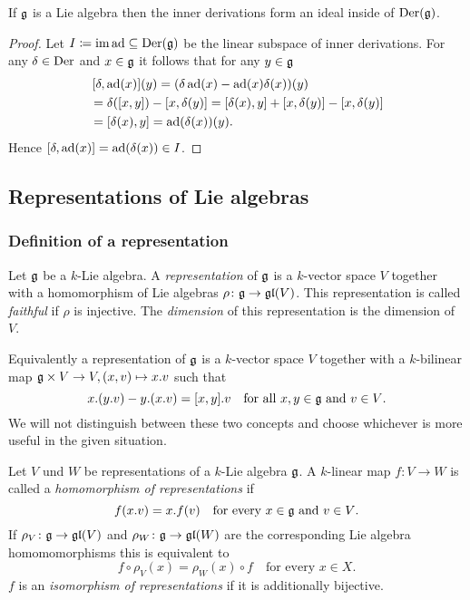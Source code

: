 \begin{lem}
 If $\mathfrak{g}$ is a Lie algebra then the inner derivations form an ideal inside of $\operatorname{Der}(\mathfrak{g})$.
\end{lem}
\begin{proof}
 Let $I \coloneqq \operatorname{im} \operatorname{ad} \subseteq \operatorname{Der}(\mathfrak{g})$ be the linear subspace of inner derivations. For any $\delta \in \operatorname{Der}$ and $x \in \mathfrak{g}$ it follows that for any $y \in \mathfrak{g}$
 \begin{align*}
  &\,[\delta, \operatorname{ad}(x)](y)
  = (\delta \operatorname{ad}(x) - \operatorname{ad}(x) \delta(x))(y) \\
  &= \delta([x,y]) - [x,\delta(y)]
  = [\delta(x),y] + [x,\delta(y)] - [x,\delta(y)] \\
  &= [\delta(x),y]
  = \operatorname{ad}(\delta(x))(y).
 \end{align*}
 Hence $[\delta, \operatorname{ad}(x)] = \operatorname{ad}(\delta(x)) \in I$.
\end{proof}










\subsection{Representations of Lie algebras}



\subsubsection{Definition of a representation}


\begin{defi}
 Let $\mathfrak{g}$ be a $k$-Lie algebra. A \emph{representation} of $\mathfrak{g}$ is a $k$-vector space $V$ together with a homomorphism of Lie algebras $\rho \colon \mathfrak{g} \to \mathfrak{gl}(V)$. This representation is called \emph{faithful} if $\rho$ is injective. The \emph{dimension} of this representation is the dimension of $V$.
\end{defi}


\begin{rem}
 Equivalently a representation of $\mathfrak{g}$ is a $k$-vector space $V$ together with a $k$-bilinear map $\mathfrak{g} \times V \to V, (x,v) \mapsto x.v$ such that
 \[
  x.(y.v) - y.(x.v) = [x,y].v \quad \text{for all $x,y \in \mathfrak{g}$ and $v \in V$}.
 \]
 We will not distinguish between these two concepts and choose whichever is more useful in the given situation.
\end{rem}


\begin{defi}
 Let $V$ und $W$ be representations of a $k$-Lie algebra $\mathfrak{g}$. A $k$-linear map $f \colon V \to W$ is called a \emph{homomorphism of representations} if
 \[
  f(x.v) = x.f(v) \quad \text{for every $x \in \mathfrak{g}$ and $v \in V$}.
 \]
 If $\rho_V \colon \mathfrak{g} \to \mathfrak{gl}(V)$ and $\rho_W \colon \mathfrak{g} \to \mathfrak{gl}(W)$ are the corresponding Lie algebra homomomorphisms this is equivalent to
 \[
  f \circ \rho_V(x) = \rho_W(x) \circ f \quad \text{for every $x \in X$}.
 \]
 $f$ is an \emph{isomorphism of representations} if it is additionally bijective.
\end{defi}


